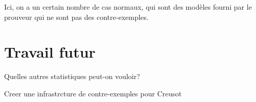 \documentclass[a4paper,11pt]{article}
\begin{document}
Ici, on a un certain nombre de cas normaux, qui sont des modèles fourni par le
prouveur qui ne sont pas des contre-exemples.

\section{Travail futur}

Quelles autres statistiques peut-on vouloir?

Creer une infrastrcture de contre-exemples pour Creusot

\clearpage



%
\end{document}
